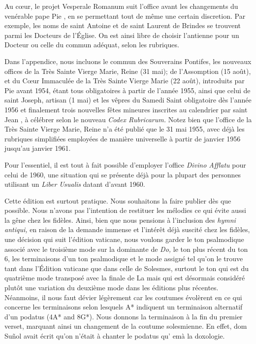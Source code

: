 \begin{frpars}
Au cœur, le projet Vesperale Romanum suit l'office avant les changements du venérable pape Pie , en se permettant tout de même une certain discretion. Par exemple, les noms de saint Antoine et de saint Laurent de Brindes se trouvent parmi les Docteurs de l'Église. On est ainsi libre de choisir l'antienne pour un Docteur ou celle du commun adéquat, selon les rubriques.

Dans l'appendice, nous incluons le commun des Souverains Pontifes, les nouveaux offices de la Très Sainte Vierge Marie, Reine (31 mai); de l'Assomption (15 août), et du Cœur Immaculée de la Très Sainte Vierge Marie (22 août), introduits par Pie  avant 1954, étant tous obligatoires à partir de l'année 1955, ainsi que celui de saint Joseph, artisan (1 mai) et les vêpres du Samedi Saint obligatoire dès l'année 1956 et finalement trois nouvelles fêtes mineures inscrites au calendrier par saint Jean , à célébrer selon le nouveau \textit{Codex Rubricarum.} Notez bien que l'office de la Très Sainte Vierge Marie, Reine n'a été publié que le 31 mai 1955, avec déjà les rubriques simplifiées employées de manière universelle à partir de janvier 1956 jusqu'au janvier 1961.

Pour l'essentiel, il est tout à fait possible d'employer l'office \textit{Divino Afflatu} pour celui de 1960, une situation qui se présente déjà pour la plupart des personnes utilisant un \textit{Liber Usualis} datant d'avant 1960.

Cette édition est surtout pratique. Nous souhaitons la faire publier dès que possible. Nous n'avons pas l'intention de restituer les mélodies ce qui évite aussi la gêne chez les fidèles. Ainsi, bien que nous pensions à l'inclusion des \textit{hymni antiqui,} en raison de la demande immense et l'intérêt déjà suscité chez les fidèles, une décision qui suit l'édition vaticane, nous voulons garder le ton psalmodique associé avec le troisième mode sur la dominante de \textit{Do,} le ton plus récent du ton 6, les terminaisons d'un ton psalmodique et le mode assigné tel qu'on le trouve tant dans l'Édition vaticane que dans celle de Solesmes, surtout le ton qui est du quatrième mode transposé avec la finale de La mais qui est désormais considéré plutôt une variation du deuxième mode dans les éditions plus récentes. Néanmoins, il nous faut dévier légèrement car les coutumes évolèrent en ce qui concerne les terminaisons selon lesquels A* indiquent un terminaison alternatif d'un podatus  (4A* and 8G*). Nous donnons la terminaison à la fin du premier verset, marquant ainsi un changement de la coutume solesmienne. En effet, dom Suñol avait écrit qu'on n'était à chanter le podatus qu' emà la doxologie.


\end{frpars}
